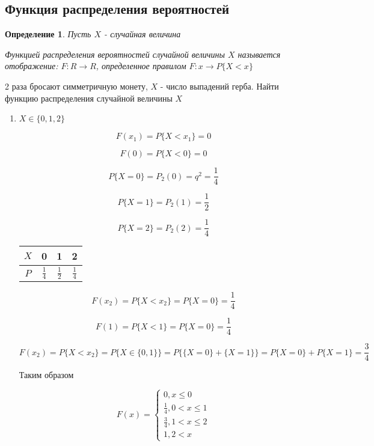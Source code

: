 \documentclass[a4paper, 14pt]{report}
\newtheorem{defenition}{Определение}[section]
\begin{document}
\subsection{Функция распределения вероятностей}

\begin{defenition}
    Пусть $X$ - случайная величина

    Функцией распределения вероятностей случайной величины $X$ называется отображение: $F: R \to R$, определенное правилом $F: x \to P\{X < x\}$
\end{defenition}

2 раза бросают симметричную монету, $X$ - число выпадений герба. Найти функцию распределения случайной величины $X$

\begin{enumerate}
    \item $X \in \{0,1,2\}$

        $$F(x_1) = P\{X < x_1\} = 0$$

        $$F(0) = P\{X < 0\} = 0$$

        $$P\{X=0\} = P_2(0) = q^2 = \frac{1}{4}$$

        $$P\{X=1\} = P_2(1) = \frac{1}{2}$$

        $$P\{X=2\} = P_2(2) = \frac{1}{4}$$

        \begin{tabular}{|c||c|c|c|}
            \hline
            $X$ & 0 & 1 & 2 \\
            \hline
            $P$ & $\frac{1}{4}$ & $\frac{1}{2}$ & $\frac{1}{4}$ \\
            \hline
        \end{tabular}

        $$
        F(x_2) = P\{X<x_2\} = P\{X=0\} = \frac{1}{4}
        $$

        $$
        F(1) =  P\{X<1\} = P\{X=0\} = \frac{1}{4}
        $$

        $$
        F(x_2) =  P\{X<x_2\} = P\{X\in\{0,1\}\} = P\big\{ \{X=0\} + \{X=1\} \big\} = P\{X=0\} + P\{X=1\} = \frac{3}{4}
        $$

        Таким образом

        $$
        F(x) =
        \begin{cases}
            0, x \le 0 \\
            \frac{1}{4}, 0 < x \le 1 \\
            \frac{3}{4}, 1 < x \le 2 \\
            1, 2 < x
        \end{cases}
        $$
\end{enumerate}
\end{document}
